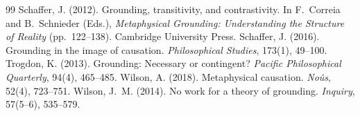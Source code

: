 \documentclass{situationist-preprint}
\begin{document}
\begin{thebibliography}{99}
 Schaffer, J. (2012). Grounding, transitivity, and contrastivity. In F.~Correia and B.~Schnieder (Eds.), \emph{Metaphysical Grounding: Understanding the Structure of Reality} (pp.~122--138). Cambridge University Press.
 Schaffer, J. (2016). Grounding in the image of causation. \emph{Philosophical Studies}, 173(1), 49--100.
 Trogdon, K. (2013). Grounding: Necessary or contingent? \emph{Pacific Philosophical Quarterly}, 94(4), 465--485.
 Wilson, A. (2018). Metaphysical causation. \emph{No\^us}, 52(4), 723--751.
 Wilson, J.~M. (2014). No work for a theory of grounding. \emph{Inquiry}, 57(5--6), 535--579.
\end{thebibliography}
\end{document}

